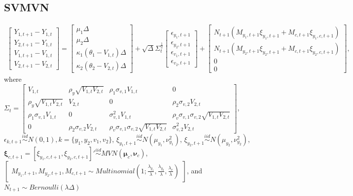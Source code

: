 \documentclass{article}\usepackage[]{graphicx}\usepackage[]{color}
\begin{document}
\subsection{SVMVN}

\begin{align}
    \begin{bmatrix} Y_{1,t + 1} - Y_{1,t} \\ Y_{2,t + 1} - Y_{1,t} \\ V_{1,t + 1} - V_{1,t} \\ V_{2,t + 1} - V_{2,t} \end{bmatrix} = \begin{bmatrix} \mu_1 \Delta \\ \mu_2 \Delta \\ \kappa_1(\theta_1 - V_{1,t}) \Delta \\ \kappa_2(\theta_2 - V_{2,t}) \Delta \end{bmatrix} + \sqrt{\Delta}\Sigma_t^{\frac{1}{2}} \begin{bmatrix} \epsilon_{y_1,t+1} \\ \epsilon_{y_2,t+1} \\ \epsilon_{v_1,t+1} \\ \epsilon_{v_2,t+1} \end{bmatrix} + \begin{bmatrix} N_{t+1}(M_{y_1,t+1} \xi_{y_1, t+1} + M_{c,t+1} \xi_{y_1,c,t+1}) \\ N_{t+1}(M_{y_2,t+1} \xi_{y_2, t+1} + M_{c,t+1} \xi_{y_2,c,t+1}) \\ 0 \\ 0 \end{bmatrix}, \label{S_tdisc_2d}
\end{align}
where $\Sigma_{t} = \begin{bmatrix} V_{1,t} & \rho_y \sqrt{V_{1,t}V_{2,t}} & \rho_1 \sigma_{v,1} V_{1,t} & 0 \\ \rho_y \sqrt{V_{1,t}V_{2,t}} & V_{2,t} & 0 & \rho_2 \sigma_{v,2} V_{2,t} \\ \rho_1 \sigma_{v,1} V_{1,t} & 0 & \sigma_{v,1}^2 V_{1,t} & \rho_v \sigma_{v,1}\sigma_{v,2} \sqrt{V_{1,t} V_{2,t}} \\ 0 & \rho_2 \sigma_{v,2} V_{2,t} & \rho_v \sigma_{v,1}\sigma_{v,2} \sqrt{V_{1,t} V_{2,t}} & \sigma_{v,2}^2 V_{2,t} \end{bmatrix}$, \\$\epsilon_{k,t+1} \overset{iid}{\sim} N(0,1), k = \{y_1,y_2,v_1,v_2\}$, $\xi_{y_1,t+1} \overset{iid}{\sim} N(\mu_{y_1}, \nu_{y_1}^2)$, $\xi_{y_2,t+1} \overset{iid}{\sim} N(\mu_{y_2}, \nu_{y_2}^2)$, $\boldsymbol{\xi}_{c,t+1} = [\xi_{y_1,c,t+1}, \xi_{y_2,c,t+1}]' \overset{iid}{\sim} MVN(\boldsymbol{\mu}_c, \boldsymbol{\nu}_c)$, $\begin{bmatrix}
M_{y_1,t+1},M_{y_2,t+1},M_{c,t+1} \sim Multinomial(1;\frac{\lambda_{y_1}}{\lambda},\frac{\lambda_{y_2}}{\lambda},\frac{\lambda_c}{\lambda})
\end{bmatrix}$, and $N_{t+1} \sim Bernoulli(\lambda\Delta)$
\end{document}

